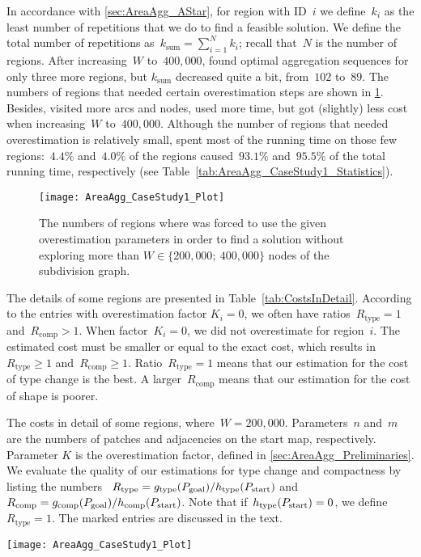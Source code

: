 In accordance with \sect\ref{sec:AreaAgg_AStar}, 
for region with ID~$i$ 
we define~$k_i$ as the least number of repetitions 
that we do to find a feasible solution. 
We define the total number of repetitions 
as~$k_\mathrm{sum}=\sum_{i=1}^N k_i$; 
recall that~$N$ is the number of regions.
After increasing~$W$ to~$400{,}000$, 
\Astar found optimal aggregation sequences 
for only three more regions, 
but $k_\mathrm{sum}$ decreased quite a bit, 
from~$102$ to~$89$. 
The numbers of regions that needed certain
overestimation steps are shown in 
\fig\ref{fig:AreaAgg_OverStats}. 
Besides, \Astar visited more arcs and nodes, 
used more time, 
but got (slightly) less cost when increasing~$W$ to~$400{,}000$.
Although the number of regions 
that needed overestimation is relatively small, 
\Astar spent most of the running time 
on those few regions:~$4.4\%$ and~$4.0\%$ of the regions 
caused~$93.1\%$ and~$95.5\%$ of the total running time, 
respectively 
(see Table~\ref{tab:AreaAgg_CaseStudy1_Statistics}).

\begin{figure}[tb]
\centering
\texttt{[image: AreaAgg\_CaseStudy1\_Plot]}
\caption{The numbers of regions where \Astar was 
	forced to use the given overestimation parameters
	in order to find a solution 
	without exploring more than 
	$W \in \{200{,}000;~400{,}000\}$ 
	nodes of the subdivision graph.}
\label{fig:AreaAgg_OverStats}
\end{figure}

The details of some regions are presented in 
Table~\ref{tab:CostsInDetail}.
According to the entries with overestimation factor $K_i=0$, 
we often have 
ratios~$R_\mathrm{type}=1$ and~$R_\mathrm{comp}>1$.
When factor~$K_i=0$, we did not overestimate for region~$i$.
The estimated cost must be smaller or equal to the exact cost,
which results in~$R_\mathrm{type}\ge 1$ 
and~$R_\mathrm{comp}\ge 1$.
Ratio~$R_\mathrm{type} = 1$ means that our estimation for the 
cost of type change is the best.
A larger~$R_\mathrm{comp}$ means that our estimation for the 
cost of shape is poorer.

\begin{table*}[tb]
\caption{The costs in detail of some regions, 
	where~$W=200{,}000$.  
	Parameters~$n$ and~$m$ are the numbers of patches and 
	adjacencies on the start map, respectively.
	Parameter $K$ is the overestimation factor, 
	defined in \sect\ref{sec:AreaAgg_Preliminaries}. 
	We evaluate the quality 
	of our estimations for type change and 
	compactness by listing the numbers~
	$R_\mathrm{type}=g_\mathrm{type}(P_\mathrm{goal})
	/h_\mathrm{type}(P_\mathrm{start})$ and~
	$R_\mathrm{comp}=g_\mathrm{comp}(P_\mathrm{goal})
	/h_\mathrm{comp}(P_\mathrm{start})$. 
	Note that if~$h_\mathrm{type}(P_\mathrm{start})=0$, 
	we define~$R_\mathrm{type}=1$.
	The marked entries are discussed in the text.
}
\label{tab:CostsInDetail}
\centering
\texttt{[image: AreaAgg\_CaseStudy1\_Plot]}
\end{table*}


